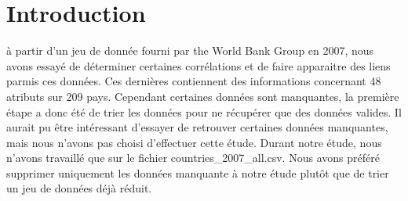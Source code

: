 \section{Introduction}

    à partir d'un jeu de donnée fourni par the World Bank Group en 2007, nous avons essayé de déterminer certaines corrélations et de faire apparaitre des liens parmis ces données.
    Ces dernières contiennent des informations concernant 48 atributs sur 209 pays.
    Cependant certaines données sont manquantes, la première étape a donc été de trier les données pour ne récupérer que des données valides.
    Il aurait pu être intéressant d'essayer de retrouver certaines données manquantes, mais nous n'avons pas choisi d'effectuer cette étude.
	Durant notre étude, nous n'avons travaillé que sur le fichier countries\_2007\_all.csv. Nous avons préféré supprimer uniquement les données manquante à notre étude plutôt que de trier un jeu de données déjà réduit.
	    
